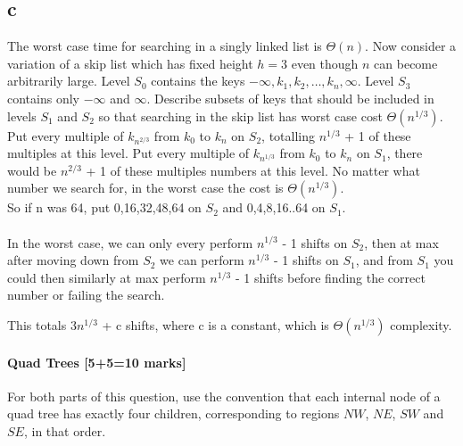 \documentclass[12pt]{article}
\begin{document}
\begin{enumerate}
\part{c} The worst case time for searching in a singly linked list
      is $\Theta(n)$.   Now consider a variation of  a skip list which
      has fixed height $h=3$ even though $n$ can become arbitrarily large.
      Level $S_0$ contains the keys $-\infty,k_1,k_2,\ldots,k_n,\infty$.
      Level $S_3$ contains only $-\infty$ and $\infty$.
      Describe subsets of keys that should be included in levels $S_1$
      and $S_2$ so that searching in the skip list has worst case cost
      $\Theta(n^{1/3})$.\\

      Put every multiple of $k_{n^{2/3}}$ from $k_0$ to $k_n$ on $S_2$, totalling $n^{1/3}$ + 1 of these multiples at this level. Put every multiple of $k_{n^{1/3}}$ from $k_0$ to $k_n$ on $S_1$, there would be $n^{2/3}$ + 1 of these multiples numbers at this level. No matter what number we search for, in the worst case the cost is $\Theta(n^{1/3})$.\\

      So if n was 64, put 0,16,32,48,64 on $S_2$ and 0,4,8,16..64 on $S_1$.\\\\

      In the worst case, we can only every perform $n^{1/3}$ - 1 shifts on $S_2$, then at max after moving down from $S_2$ we can perform $n^{1/3}$ - 1 shifts on $S_1$, and from $S_1$ you could then similarly at max perform $n^{1/3}$ - 1 shifts before finding the correct number or failing the search.

      This totals 3$n^{1/3}$ + c shifts, where c is a constant, which is $\Theta(n^{1/3})$ complexity.

\end{enumerate}

\subsection{Quad Trees [5+5=10 marks]} 
For both parts of this question, use the convention that each
internal node of a quad tree has exactly four children, corresponding
to regions $NW$, $NE$, $SW$ and $SE$, in that order.
\end{document}
